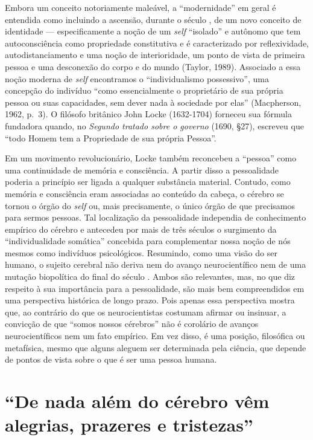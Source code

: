 Embora um conceito notoriamente maleável, a ``modernidade'' em geral é
entendida como incluindo a ascensão, durante o século , de um novo
conceito de identidade --- especificamente a noção de um \emph{self}
``isolado'' e autônomo que tem autoconsciência como propriedade
constitutiva e é caracterizado por reflexividade, autodistanciamento e
uma noção de interioridade, um ponto de vista de primeira pessoa e uma
desconexão do corpo e do mundo (Taylor, 1989). Associado a essa noção
moderna de \emph{self} encontramos o ``individualismo possessivo'', uma
concepção do indivíduo ``como essencialmente o proprietário de sua
própria pessoa ou suas capacidades, sem dever nada à sociedade por
elas'' (Macpherson, 1962, p.~3). O filósofo britânico John Locke
(1632-1704) forneceu sua fórmula fundadora quando, no \emph{Segundo
tratado sobre o governo} (1690, §27), escreveu que ``todo Homem tem a
Propriedade de sua própria Pessoa''.

Em um movimento revolucionário, Locke também reconcebeu a ``pessoa''
como uma continuidade de memória e consciência. A partir disso a
pessoalidade poderia a princípio ser ligada a qualquer substância
material. Contudo, como memória e consciência eram associadas ao
conteúdo da cabeça, o cérebro se tornou o órgão do \emph{self} ou, mais
precisamente, o único órgão de que precisamos para sermos pessoas.
Tal localização da pessoalidade independia de conhecimento empírico do
cérebro e antecedeu por mais de três séculos o surgimento da
``individualidade somática'' concebida para complementar nossa noção de
nós mesmos como indivíduos psicológicos. Resumindo, como uma visão do
ser humano, o sujeito cerebral não deriva nem do avanço neurocientífico
nem de uma mutação biopolítica do final do século . Ambos são
relevantes, mas, no que diz respeito à sua importância para a
pessoalidade, são mais bem compreendidos em uma perspectiva histórica de
longo prazo. Pois apenas essa perspectiva mostra que, ao contrário do
que os neurocientistas costumam afirmar ou insinuar, a convicção de que
``somos nossos cérebros'' não é corolário de avanços neurocientíficos
nem um fato empírico. Em vez disso, é uma posição, filosófica ou
metafísica, mesmo que alguns aleguem ser determinada pela ciência, que
depende de pontos de vista sobre o que é ser uma pessoa humana.

\section{``De nada além do cérebro vêm alegrias, prazeres e tristezas''}

